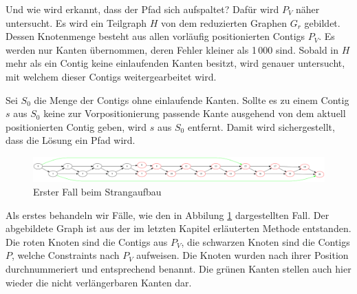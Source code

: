 Und wie wird erkannt, dass der Pfad sich aufspaltet? Dafür wird $P_V$ näher untersucht.
Es wird ein Teilgraph $H$ von dem reduzierten Graphen $G_r$ gebildet.
Dessen Knotenmenge besteht aus allen vorläufig positionierten Contigs $P_V$. 
Es werden nur Kanten übernommen, deren Fehler kleiner als 1\,000 sind. Sobald in $H$ mehr als ein Contig keine einlaufenden Kanten besitzt, wird genauer untersucht, mit welchem dieser Contigs weitergearbeitet wird.

Sei $S_0$ die Menge der Contigs ohne einlaufende Kanten. Sollte es zu einem Contig $s$ aus $S_0$ keine zur Vorpositionierung passende Kante 
ausgehend von dem aktuell positionierten Contig 
geben, wird $s$ aus $S_0$ entfernt. Damit wird sichergestellt, dass die Lösung ein Pfad 
wird.

\begin{figure}
	\begin{center}
		\includegraphics[width=1\textwidth]{bilder/msplit3}
	\end{center}
	\caption{Erster Fall beim Strangaufbau}
	\label{msplit}
\end{figure}

Als erstes behandeln wir Fälle, wie den in Abbilung \ref{msplit} dargestellten Fall. Der abgebildete Graph ist aus der im letzten Kapitel erläuterten Methode entstanden. Die roten Knoten sind die Contigs aus $P_V$, die schwarzen Knoten sind die Contigs $P$, welche Constraints nach $P_V$ aufweisen. Die Knoten wurden nach ihrer Position durchnummeriert und entsprechend benannt. 
Die grünen Kanten stellen auch hier wieder die nicht verlängerbaren Kanten dar.


